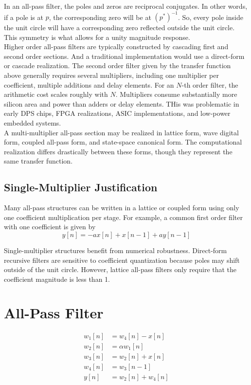 \documentclass[11pt]{report}
\theoremstyle{example}
\begin{document}
In an all-pass filter, the poles and zeros are reciprocal conjugates. In other words, if a pole is at $p$, the corresponding zero will be at $(p^*)^{-1}$. So, every pole inside the unit circle will have a corresponding zero reflected outside the unit circle. This symmetry is what allows for a unity magnitude response.\\
Higher order all-pass filters are typically constructed by cascading first and second order sections. And a traditional implementation would use a direct-form or cascade realization. The second order filter given by the transfer function above generally requires several multipliers, including one multiplier per coefficient, multiple additions and delay elements. For an $N$-th order filter, the arithmetic cost scales roughly with $N$. Multipliers consume substantially more silicon area and power than adders or delay elements. THis was problematic in early DPS chips, FPGA realizations, ASIC implementations, and low-power embedded systems.\\
A multi-multiplier all-pass section may be realized in lattice form, wave digital form, coupled all-pass form, and state-space canonical form. The computational realization differs drastically between these forms, though they represent the same transfer function.

\subsection{Single-Multiplier Justification}

Many all-pass structures can be written in a lattice or coupled form using only one coefficient multiplication per stage. For example, a common first order filter with one coefficient is given by
\begin{equation}
	y[n]=-ax[n]+x[n-1]+ay[n-1]
\end{equation}

Single-multiplier structures benefit from numerical robustness. Direct-form recursive filters are sensitive to coefficient quantization because poles may shift outside of the unit circle. However, lattice all-pass filters only require that the coefficient magnitude is less than 1.

\section{All-Pass Filter}

\begin{equation}
	\begin{aligned}
		w_1[n]&=w_4[n]-x[n]\\
		w_2[n]&=\alpha w_1[n]\\
		w_3[n]&=w_2[n]+x[n]\\
		w_4[n]&=w_3[n-1]\\
		y[n]&=w_2[n]+w_4[n]
	\end{aligned}
\end{equation}
\end{document}
